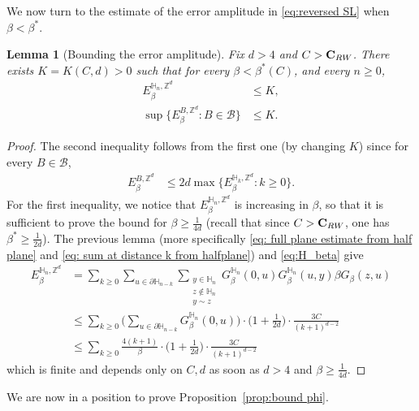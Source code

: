 \documentclass[11pt,a4paper]{article}
\numberwithin{equation}{section}
\theoremstyle{plain}
\newtheorem{Lem}[Thm]{Lemma}
\theoremstyle{definition}
\newcommand\bfC{\mathbf{C}}
\begin{document}
We now turn to the estimate of the error amplitude in \eqref{eq:reversed SL} when $\beta<\beta^*$. 
\begin{Lem}[Bounding the error amplitude]\label{lem:bound error}
Fix $d>4$ and $C>\bfC_{\rm RW}$. There exists $K=K(C,d)>0$ such that for every 
$\beta<\beta^*(C)$, and every $n\ge0 $, 
\begin{align}
E_\beta^{\mathbb H_n,\mathbb Z^d}&\le K,\\
\sup\big\{E_\beta^{B,\mathbb Z^d}:B\in \mathcal B\}&\le K.\label{eq:bound error 2 wsaw}
\end{align}
\end{Lem}

\begin{proof} The second inequality follows from the first one (by changing $K$) since for every $B\in \mathcal B$,
\begin{align}\label{eq:bound box by halfspace}
E_\beta^{B,\mathbb Z^d}&\le 2d\max \big\{E_\beta^{\mathbb H_k,\mathbb Z^d}:k\geq 0\}.
\end{align}
For the first inequality, we notice that $E_\beta^{\mathbb H_n,\mathbb Z^d}$ is increasing in $\beta$, so that it is sufficient to prove the bound for $\beta\geq \tfrac{1}{4d}$ (recall that since $C>\bfC_{\rm RW}$, one has $\beta^*\ge\tfrac1{2d}$). The previous lemma (more specifically \eqref{eq: full plane estimate from half plane} and \eqref{eq: sum at distance k from halfplane}) and \eqref{eq:H_beta} give
\begin{align}
E_\beta^{\mathbb H_n,\mathbb Z^d}
&= \sum_{k\ge 0} \sum_{u\in \partial\mathbb H_{n-k}}\sum_{\substack{y \in\mathbb H_n\\ z\notin \mathbb H_n\\ y\sim z}}G_\beta^{\mathbb H_n}(0,u)G_\beta^{\mathbb H_n}(u,y)\beta G_\beta(z,u)\\
&\le
\sum_{k\ge 0}\Big( \sum_{u\in\partial\mathbb H_{n-k}}G_\beta^{\mathbb H_n}(0,u) \Big)\cdot \Big(1+\frac{1}{2d}\Big)\cdot \frac{3C}{(k+1)^{d-2}}
\\&\le \sum_{k\ge 0} \frac{4(k+1)}{\beta} \cdot \Big(1+\frac{1}{2d}\Big)\cdot \frac{3C}{(k+1)^{d-2}}\label{eq: where d>4 is important}
\end{align}
which is finite and depends only on $C,d$ as soon as $d>4$ and $\beta\geq\tfrac1{4d}$. 
\end{proof}


We are now in a position to prove Proposition~\ref{prop:bound phi}.
\end{document}
